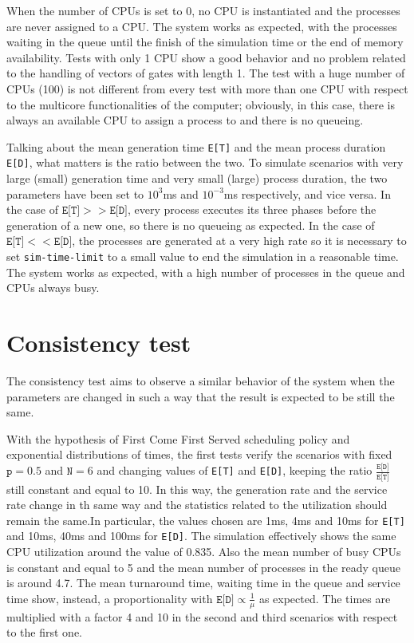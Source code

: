 When the number of CPUs is set to 0, no CPU is instantiated and the processes
are never assigned to a CPU. The system works as expected, with the processes
waiting in the queue until the finish of the simulation time or the end of
memory availability. Tests with only 1 CPU show a good behavior and no problem
related to the handling of vectors of gates with length 1. The test with
a huge number of CPUs (100) is not different from every test with more than 
one CPU with respect to the multicore functionalities of the computer; obviously,
in this case, there is always an available CPU to assign a process to and 
there is no queueing.

Talking about the mean generation time \texttt{E[T]} and the mean process duration 
\texttt{E[D]}, what matters is the ratio between the two. To simulate scenarios
with very large (small) generation time and very small (large) process duration, the two
parameters have been set to $10^3$ms and $10^{-3}$ms respectively, and vice versa.
In the case of $\texttt{E[T]}>>\texttt{E[D]}$, every process executes its three phases 
before the generation of a new one, so there is no queueing as expected.
In the case of $\texttt{E[T]}<<\texttt{E[D]}$, the processes are generated at a very high rate
so it is necessary to set \texttt{sim-time-limit} to a small value to 
end the simulation in a reasonable time. The system works as expected, with
a high number of processes in the queue and CPUs always busy.

\section{Consistency test}
The consistency test aims to observe a similar behavior of the system when the
parameters are changed in such a way that the result is expected to be still the same.

With the hypothesis of First Come First Served scheduling policy and 
exponential distributions of times, the first tests verify the scenarios 
with fixed $\texttt{p}=0.5$ and $\texttt{N}=6$ and changing values of \texttt{E[T]} and \texttt{E[D]}, 
keeping the ratio $\frac{\texttt{E[D]}}{\texttt{E[T]}}$ still constant and equal to 10. In this way, the generation
rate and the service rate change in th same way and the statistics related to
the utilization should remain the same.In particular, the values chosen are 1ms, 
4ms and 10ms for \texttt{E[T]} and 10ms, 40ms and 100ms for \texttt{E[D]}. 
The simulation effectively shows the same CPU utilization around the value of
0.835. Also the mean number of busy CPUs is constant and equal to 5 and the mean
number of processes in the ready queue is around 4.7. The mean turnaround time, 
waiting time in the queue and service time show, instead, a proportionality
with $\texttt{E[D]}\propto \frac{1}{\mu}$ as expected. The times are multiplied 
with a factor 4 and 10 in the second and third scenarios with respect to the first one.

